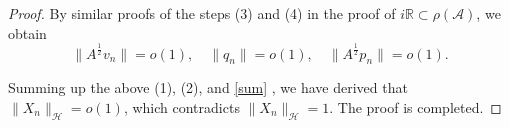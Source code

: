 \documentclass[10pt,a4paper]{amsart}
\begin{document}
\begin{proof}
By similar proofs of the steps (3) and (4) in the proof of $i\mathbb{R}\subset\rho(\mathcal{A})$, we obtain
		\begin{equation}\label{sum}
			\| A^{\frac{1}{2}} v_n \|=o(1), \quad \| q_n \|=o(1), \quad \| A^{\frac{1}{2}} p_n \|=o(1).
		\end{equation}
		
		Summing up the above (1), (2), and \eqref{sum} , we have derived that $\|X_n\|_\mathcal{H}=o(1)$, which contradicts $\|X_n\|_\mathcal{H}= 1$. The proof is completed.
\end{proof}
\end{document}
